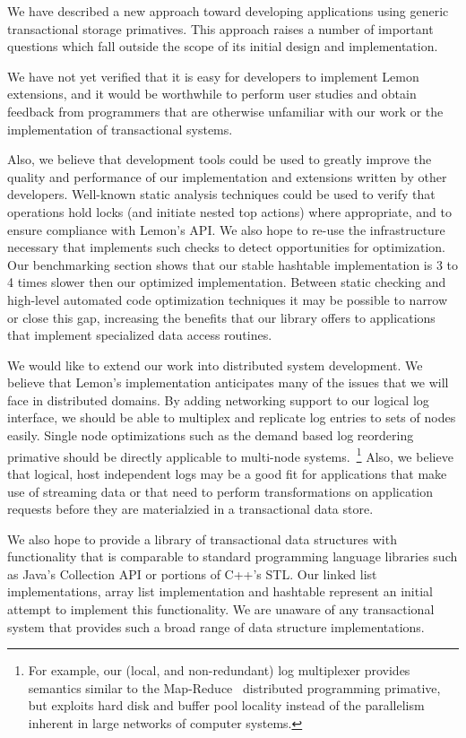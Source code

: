 \documentclass[letterpaper,twocolumn,english]{article}
\newcommand{\yad}{Lemon\xspace}
\begin{document}
We have described a new approach toward developing applications using
generic transactional storage primatives.  This approach raises a
number of important questions which fall outside the scope of its
initial design and implementation.

We have not yet verified that it is easy for developers to implement
\yad extensions, and it would be worthwhile to perform user studies
and obtain feedback from programmers that are otherwise unfamiliar
with our work or the implementation of transactional systems.

Also, we believe that development tools could be used to greatly
improve the quality and performance of our implementation and
extensions written by other developers.  Well-known static analysis
techniques could be used to verify that operations hold locks (and
initiate nested top actions) where appropriate, and to ensure
compliance with \yad's API.  We also hope to re-use the infrastructure
necessary that implements such checks to detect opportunities for
optimization.  Our benchmarking section shows that our stable
hashtable implementation is 3 to 4 times slower then our optimized
implementation.  Between static checking and high-level automated code
optimization techniques it may be possible to narrow or close this
gap, increasing the benefits that our library offers to applications
that implement specialized data access routines.

We would like to extend our work into distributed system
development.  We believe that \yad's implementation anticipates many
of the issues that we will face in distributed domains.  By adding 
networking support to our logical log interface,
we should be able to multiplex and replicate log entries to sets of
nodes easily.  Single node optimizations such as the demand based log
reordering primative should be directly applicable to multi-node
systems.~\footnote{For example, our (local, and non-redundant) log
multiplexer provides semantics similar to the
Map-Reduce~\cite{mapReduce} distributed programming primative, but
exploits hard disk and buffer pool locality instead of the parallelism
inherent in large networks of computer systems.}  Also, we believe
that logical, host independent logs may be a good fit for applications
that make use of streaming data or that need to perform
transformations on application requests before they are materialzied
in a transactional data store.

We also hope to provide a library of
transactional data structures with functionality that is comparable to
standard programming language libraries such as Java's Collection API
or portions of C++'s STL.  Our linked list implementations, array list
implementation and hashtable represent an initial attempt to implement
this functionality.  We are unaware of any transactional system that
provides such a broad range of data structure implementations.  
\end{document}

